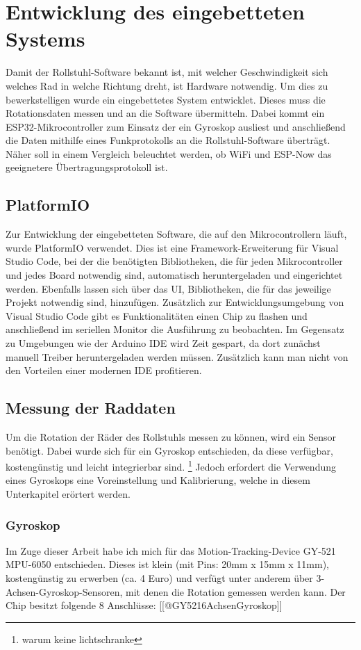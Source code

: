 \chapter{Entwicklung des eingebetteten Systems}
Damit der Rollstuhl-Software bekannt ist, mit welcher Geschwindigkeit sich welches Rad in welche Richtung dreht, ist Hardware notwendig.
Um dies zu bewerkstelligen wurde ein eingebettetes System entwicklet. Dieses muss die Rotationsdaten messen und an die Software übermitteln.
Dabei kommt ein ESP32-Mikrocontroller zum Einsatz der ein Gyroskop ausliest und anschließend die Daten mithilfe eines Funkprotokolls an die Rollstuhl-Software überträgt.
Näher soll in einem Vergleich beleuchtet werden, ob WiFi und ESP-Now das geeignetere Übertragungsprotokoll ist.

\section{PlatformIO}
Zur Entwicklung der eingebetteten Software, die auf den Mikrocontrollern läuft, wurde PlatformIO verwendet.
Dies ist eine Framework-Erweiterung für Visual Studio Code, bei der die benötigten Bibliotheken, die für jeden Mikrocontroller und jedes Board notwendig sind, automatisch heruntergeladen und eingerichtet werden.
Ebenfalls lassen sich über das UI, Bibliotheken, die für das jeweilige Projekt notwendig sind, hinzufügen.
Zusätzlich zur Entwicklungsumgebung von Visual Studio Code gibt es Funktionalitäten einen Chip zu flashen und anschließend im seriellen Monitor die Ausführung zu beobachten.
Im Gegensatz zu Umgebungen wie der Arduino IDE wird Zeit gespart, da dort zunächst manuell Treiber heruntergeladen werden müssen.
Zusätzlich kann man nicht von den Vorteilen einer modernen IDE profitieren.

\section{Messung der Raddaten}
Um die Rotation der Räder des Rollstuhls messen zu können, wird ein Sensor benötigt.
Dabei wurde sich für ein Gyroskop entschieden, da diese verfügbar, kostengünstig und leicht integrierbar sind.
\footnote{warum keine lichtschranke} Jedoch erfordert die Verwendung eines Gyroskops eine Voreinstellung und Kalibrierung, welche in diesem Unterkapitel erörtert werden.

\subsection{Gyroskop}
Im Zuge dieser Arbeit habe ich mich für das Motion-Tracking-Device GY-521 MPU-6050 entschieden.
Dieses ist klein (mit Pins: 20mm x 15mm x 11mm), kostengünstig zu erwerben (ca. 4 Euro) und verfügt unter anderem über 3-Achsen-Gyroskop-Sensoren, mit denen die Rotation gemessen werden kann.
Der Chip besitzt folgende 8 Anschlüsse: [[@GY5216AchsenGyroskop]]

